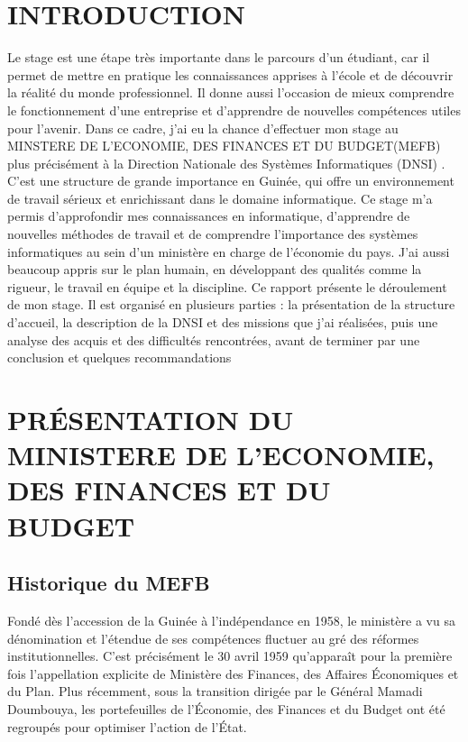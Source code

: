 \documentclass[12pt,a4paper]{article}
\begin{document}
\section{INTRODUCTION}

Le stage est une étape très importante dans le parcours d’un étudiant, car il permet de mettre en pratique les connaissances apprises à l’école et de découvrir la réalité du monde professionnel. Il donne aussi l’occasion de mieux comprendre le fonctionnement d’une entreprise et d’apprendre de nouvelles compétences utiles pour l’avenir.
Dans ce cadre, j’ai eu la chance d’effectuer mon stage au MINSTERE DE L’ECONOMIE, DES FINANCES ET DU BUDGET(MEFB) plus précisément à la Direction Nationale des Systèmes Informatiques (DNSI) . C’est une structure de grande importance en Guinée, qui offre un environnement de travail sérieux et enrichissant dans le domaine informatique.
Ce stage m’a permis d’approfondir mes connaissances en informatique, d’apprendre de nouvelles méthodes de travail et de comprendre l’importance des systèmes informatiques au sein d’un ministère en charge de l’économie du pays. J’ai aussi beaucoup appris sur le plan humain, en développant des qualités comme la rigueur, le travail en équipe et la discipline.
Ce rapport présente le déroulement de mon stage. Il est organisé en plusieurs parties : la présentation de la structure d’accueil, la description de la DNSI et des missions que j’ai réalisées, puis une analyse des acquis et des difficultés rencontrées, avant de terminer par une conclusion et quelques recommandations



\section{PRÉSENTATION DU MINISTERE DE L'ECONOMIE, DES FINANCES ET DU BUDGET}

\subsection{Historique du MEFB}

Fondé dès l'accession de la Guinée à l'indépendance en 1958, le ministère a vu sa dénomination et l'étendue de ses compétences fluctuer au gré des réformes institutionnelles. C’est précisément le 30 avril 1959 qu'apparaît pour la première fois l'appellation explicite de Ministère des Finances, des Affaires Économiques et du Plan. Plus récemment, sous la transition dirigée par le Général Mamadi Doumbouya, les portefeuilles de l'Économie, des Finances et du Budget ont été regroupés pour optimiser l'action de l'État.
\end{document}
